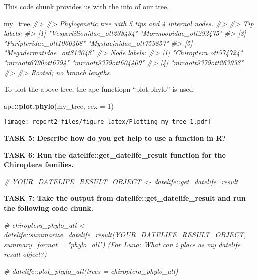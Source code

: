 \documentclass[]{article}
\newenvironment{Shaded}{\begin{snugshade}}{\end{snugshade}}
\newcommand{\CommentTok}[1]{\textcolor[rgb]{0.56,0.35,0.01}{\textit{#1}}}
\newcommand{\DataTypeTok}[1]{\textcolor[rgb]{0.13,0.29,0.53}{#1}}
\newcommand{\DecValTok}[1]{\textcolor[rgb]{0.00,0.00,0.81}{#1}}
\newcommand{\KeywordTok}[1]{\textcolor[rgb]{0.13,0.29,0.53}{\textbf{#1}}}
\newcommand{\NormalTok}[1]{#1}
\newcommand{\OperatorTok}[1]{\textcolor[rgb]{0.81,0.36,0.00}{\textbf{#1}}}
\begin{document}
This code chunk provides us with the info of our tree.

\begin{Shaded}
\begin{Highlighting}[]
\NormalTok{my_tree}
\CommentTok{#> }
\CommentTok{#> Phylogenetic tree with 5 tips and 4 internal nodes.}
\CommentTok{#> }
\CommentTok{#> Tip labels:}
\CommentTok{#> [1] "Vespertilionidae_ott238434" "Mormoopidae_ott292475"     }
\CommentTok{#> [3] "Furipteridae_ott1060468"    "Mystacinidae_ott759857"    }
\CommentTok{#> [5] "Megadermatidae_ott813048"  }
\CommentTok{#> Node labels:}
\CommentTok{#> [1] "Chiroptera ott574724" "mrcaott6790ott6794"   "mrcaott9379ott604409"}
\CommentTok{#> [4] "mrcaott9379ott263938"}
\CommentTok{#> }
\CommentTok{#> Rooted; no branch lengths.}
\end{Highlighting}
\end{Shaded}

To plot the above tree, the ape functiopn ``plot.phylo'' is used.

\begin{Shaded}
\begin{Highlighting}[]
\NormalTok{ape}\OperatorTok{::}\KeywordTok{plot.phylo}\NormalTok{(my_tree, }\DataTypeTok{cex =} \DecValTok{1}\NormalTok{)}
\end{Highlighting}
\end{Shaded}

\texttt{[image: report2\_files/figure-latex/Plotting\_my\_tree-1.pdf]}

\textbf{TASK 5: Describe how do you get help to use a function in R?}

\textbf{TASK 6: Run the datelife::get\_datelife\_result function for the
Chiroptera families.}

\begin{Shaded}
\begin{Highlighting}[]
\CommentTok{# YOUR_DATELIFE_RESULT_OBJECT <- datelife::get_datelife_result}
\end{Highlighting}
\end{Shaded}

\textbf{TASK 7: Take the output from datelife::get\_datelife\_result and
run the following code chunk.}

\begin{Shaded}
\begin{Highlighting}[]
 \CommentTok{# chiroptera_phylo_all <- datelife::summarize_datelife_result(YOUR_DATELIFE_RESULT_OBJECT, summary_format = "phylo_all")  (For Luna: What can i place as my datelife result object?)}

\CommentTok{# datelife::plot_phylo_all(trees = chiroptera_phylo_all)}
\end{Highlighting}
\end{Shaded}
\end{document}
